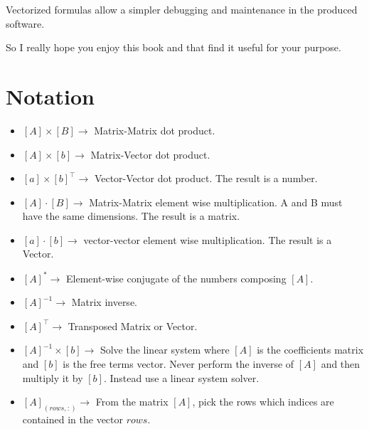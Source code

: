 \documentclass[nols,a4paper,twoside,symmetric,notoc,fleqn]{tufte-book}
\begin{document}
Vectorized formulas allow a simpler debugging and maintenance in the produced software.

So I really hope you enjoy this book and that find it useful for your purpose.

\chapter{Notation}
\begin{fullwidth}

\begin{multicols}{2}

\begin{itemize}
	
	\item $[A] \times [B] \rightarrow$ Matrix-Matrix dot product.
	
	\item $[A] \times [b] \rightarrow$ Matrix-Vector dot product.
	
	\item $[a] \times [b]^\top \rightarrow$ Vector-Vector dot product. The result is a number.
	
	\item $[A] \cdot [B] \rightarrow$ Matrix-Matrix element wise multiplication. A and B must have the same dimensions. The result is a matrix.
	
	\item $[a] \cdot [b] \rightarrow$ vector-vector element wise multiplication. The result is a Vector.
	
	\item $[A]^{*}\rightarrow$ Element-wise conjugate of the numbers composing $[A]$.
	
	\item $[A]^{-1}\rightarrow$ Matrix inverse.
	
	\item $[A]^{\top}\rightarrow$ Transposed Matrix or Vector.
	
	\item $[A]^{-1} \times [b] \rightarrow$ Solve the linear system where $[A]$ is the coefficients matrix and $[b]$ is the free terms vector. Never perform the inverse of $[A]$ and then multiply it by $[b]$. Instead use a linear system solver.
	
	\item $[A]_{(rows, :)} \rightarrow$ From the matrix $[A]$, pick the rows which indices are contained in the vector $rows$.
	

\end{itemize}
\end{multicols}
\end{fullwidth}
\end{document}
